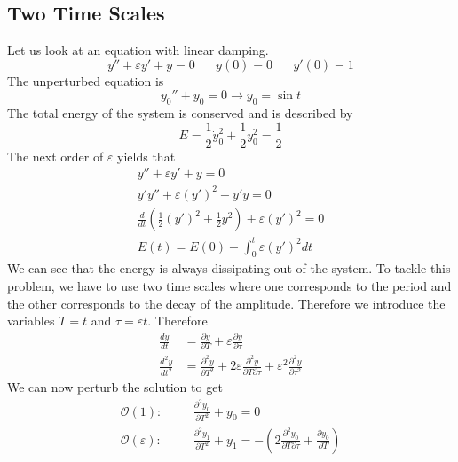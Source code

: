 \documentclass{article}
\newcommand{\pd}[2]{\frac{\partial #1}{\partial #2}}
\newcommand{\od}[2]{\frac{d #1}{d #2}}
\newcommand{\pdt}[2]{\frac{\partial ^2 #1}{\partial #2 ^2}}
\newcommand{\odt}[2]{\frac{d^2 #1}{d #2 ^2}}
\newcommand{\twen}{\hspace{20pt}}
\begin{document}
\subsection{Two Time Scales}
Let us look at an equation with linear damping.
\begin{equation*}
    y'' + \varepsilon y' + y =0 \twen y(0)=0 \twen y'(0)=1
\end{equation*}
The unperturbed equation is 
\begin{equation*}
    y_0''+y_0 =0\to y_0 = \sin t
\end{equation*}
The total energy of the system is conserved and is described by 
\begin{equation*}
    E = \frac{1}{2}\dot y_0^2 + \frac{1}{2}y_0^2 = \frac{1}{2}
\end{equation*}
The next order of $\varepsilon$ yields that 
\begin{equation*}
    \begin{split}
        y'' + \varepsilon y'+y=0 \\
        y'y''+\varepsilon(y')^2+y'y=0 \\
        \od{}{t} \left( \frac{1}{2} (y')^2+\frac{1}{2}y^2\right) + \varepsilon(y')^2=0 \\
        E(t) = E(0) - \int^t_0 \varepsilon(y')^2dt
    \end{split}
\end{equation*}
We can see that the energy is always dissipating out of the system. To tackle this problem, we have to use two time scales where one corresponds to the period and the other corresponds to the decay of the amplitude. Therefore we introduce the variables $T=t$ and $\tau =\varepsilon t$. Therefore 
\begin{equation*}
    \begin{split}
        \od{y}{t} &= \pd{y}{T} + \varepsilon \pd{y}{\tau} \\
        \odt{y}{t} &= \pdt{y}{T} + 2\varepsilon \pd{^2y}{T\partial\tau} + \varepsilon^2 \pdt{y}{\tau}
    \end{split}
\end{equation*}
We can now perturb the solution to get 
\begin{equation*}
    \begin{split}
        \mathcal{O}(1): & \twen\pdt{y_0}{T} + y_0 =0 \\
        \mathcal{O}(\varepsilon):&\twen \pdt{y_1}{T} +y _1 = -\left( 2 \pd{^2 y_0}{T\partial \tau} + \pd{y_0}{T} \right)
    \end{split}
\end{equation*}
\end{document}
